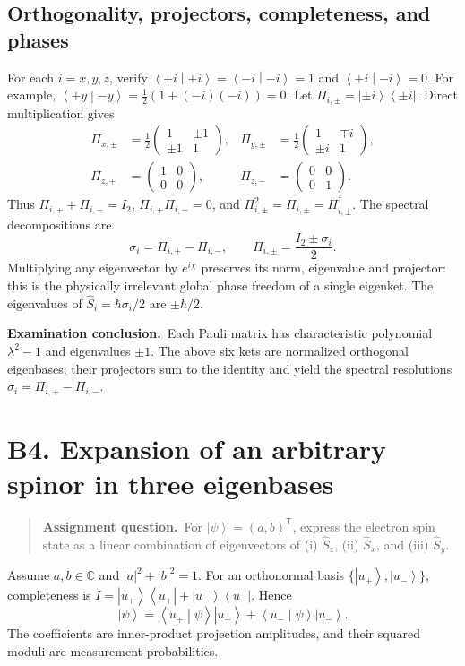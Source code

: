 \documentclass[11pt,a4paper]{article}
\theoremstyle{definition}
\newcommand{\ket}[1]{\left|#1\right\rangle}
\newcommand{\bra}[1]{\left\langle#1\right|}
\newcommand{\ip}[2]{\left\langle#1\middle|#2\right\rangle}
\newenvironment{question}{\begin{quote}\small\noindent\textbf{Assignment question.}\ }{\end{quote}}
\newcommand{\exam}[1]{\par\medskip\noindent\textbf{Examination conclusion.}\ #1\par}
\begin{document}
\subsection{Orthogonality, projectors, completeness, and phases}
For each \(i=x,y,z\), verify \(\ip{+i}{+i}=\ip{-i}{-i}=1\) and \(\ip{+i}{-i}=0\). For example, \(\ip{+y}{-y}=\frac12(1+(-i)(-i))=0\). Let \(\Pi_{i,\pm}=\ket{\pm i}\bra{\pm i}\). Direct multiplication gives
\begin{align}
\Pi_{x,\pm}&=\frac12\begin{pmatrix}1&\pm1\\\pm1&1\end{pmatrix},&
\Pi_{y,\pm}&=\frac12\begin{pmatrix}1&\mp i\\\pm i&1\end{pmatrix},\\
\Pi_{z,+}&=\begin{pmatrix}1&0\\0&0\end{pmatrix},&
\Pi_{z,-}&=\begin{pmatrix}0&0\\0&1\end{pmatrix}.
\end{align}
Thus \(\Pi_{i,+}+\Pi_{i,-}=I_2\), \(\Pi_{i,+}\Pi_{i,-}=0\), and \(\Pi_{i,\pm}^2=\Pi_{i,\pm}=\Pi_{i,\pm}^\dagger\). The spectral decompositions are
\begin{equation}
\boxed{\sigma_i=\Pi_{i,+}-\Pi_{i,-},\qquad \Pi_{i,\pm}=\frac{I_2\pm\sigma_i}{2}.}
\end{equation}
Multiplying any eigenvector by \(e^{i\chi}\) preserves its norm, eigenvalue and projector: this is the physically irrelevant global phase freedom of a single eigenket. The eigenvalues of \(\hat S_i=\hbar\sigma_i/2\) are \(\pm\hbar/2\).
\exam{Each Pauli matrix has characteristic polynomial \(\lambda^2-1\) and eigenvalues \(\pm1\). The above six kets are normalized orthogonal eigenbases; their projectors sum to the identity and yield the spectral resolutions \(\sigma_i=\Pi_{i,+}-\Pi_{i,-}\).}

\section{B4. Expansion of an arbitrary spinor in three eigenbases}
\begin{question}For \(\ket\psi=(a,b)^{\mathsf T}\), express the electron spin state as a linear combination of eigenvectors of (i) \(\hat S_z\), (ii) \(\hat S_x\), and (iii) \(\hat S_y\).\end{question}
Assume \(a,b\in\mathbb C\) and \(|a|^2+|b|^2=1\). For an orthonormal basis \(\{\ket{u_+},\ket{u_-}\}\), completeness is \(I=\ket{u_+}\bra{u_+}+\ket{u_-}\bra{u_-}\). Hence
\begin{equation}
\ket\psi=\ip{u_+}{\psi}\ket{u_+}+\ip{u_-}{\psi}\ket{u_-}.
\end{equation}
The coefficients are inner-product projection amplitudes, and their squared moduli are measurement probabilities.
\end{document}
